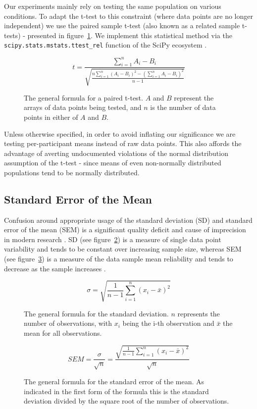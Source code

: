 	    Our experiments mainly rely on testing the same population on various conditions.
	    To adapt the t-test to this constraint (where data points are no longer independent) we use the paired sample t-test (also known as a related sample t-tests) - presented in figure~\ref{eq:m_sa_pt}.
	    We implement this statistical method via the \colorbox{vlg}{\texttt{scipy.stats.mstats.ttest\_rel}} function of the SciPy ecosystem \citep{scipy,Oliphant2007}.

	    \begin{figure}[H]
		\[ t = \frac{\sum\limits_{i=1}^n A_{i}-B_{i}}{\sqrt{\frac{n \sum\limits_{i=1}^n (A_{i}-B_{i})^{2} - \left(\sum\limits_{i=1}^n A_{i}-B_{i}\right)^{2}}{n-1}}} \]
		\caption{The general formula for a paired t-test. $A$ and $B$ represent the arrays of data points being tested, and $n$ is the number of data points in either of $A$ and $B$.}
		\label{eq:m_sa_pt}
	    \end{figure}
	    
	    Unless otherwise specified, in order to avoid inflating our significance we are testing per-participant means instead of raw data points.
	    This also affords the advantage of averting undocumented violations of the normal distribution assumption of the t-test -
	    since means of even non-normally distributed populations tend to be normally distributed.  
	\subsection{Standard Error of the Mean}\label{sec:m_sa_se}
	    Confusion around appropriate usage of the standard deviation (SD) and standard error of the mean (SEM) is a significant quality deficit and cause of imprecision in modern research \citep{Nagele2003}.
	    SD (see figure~\ref{eq:m_sa_sd}) is a measure of single data point variability and tends to be constant over increasing sample size, 
	    whereas SEM (see figure~\ref{eq:m_sa_se}) is a measure of the data sample mean reliability and tends to decrease as the sample increases \citep{Altman2005,Streiner1996}.
	    
	    \begin{multicols}{2}
		\begin{figure}[H]
		    \[ \sigma = \sqrt{\frac{1}{n-1} \sum\limits_{i=1}^n (x_i - \bar{x})^2} \]
		    \caption{The general formula for the standard deviation. $n$ represents the number of observations, with $x_i$ being the i-th observation and $\bar{x}$ the mean for all observations.}
		    \label{eq:m_sa_sd}
		\end{figure}
		\begin{figure}[H]
		    \[ SEM = \frac{\sigma}{\sqrt{n}} = \frac{\sqrt{\frac{1}{n-1} \sum\limits_{i=1}^n (x_i - \bar{x})^2}}{\sqrt{n}} \]
		    \caption{The general formula for the standard error of the mean. As indicated in the first form of the formula this is the standard deviation divided by the square root of the number of observations.}
		    \label{eq:m_sa_se}
		\end{figure}
	    \end{multicols}
	    
